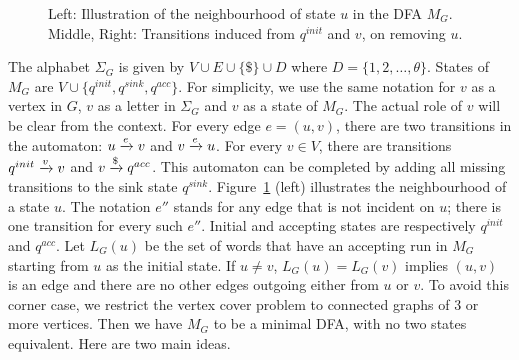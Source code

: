 \begin{figure}
    \caption{Left: Illustration of the neighbourhood of state
      $u$ in the DFA
      $M_G$. Middle, Right: Transitions induced from
      $q^{init}$ and $v$, on removing $u$.}
    \label{fig:complexity-mg}
  \end{figure}

  The alphabet $\Sigma_G$ is given by $V \cup E \cup \{ \$\} \cup
  D$ where $D = \{1,2, \dots, \theta\}$. States of $M_G$ are $V \cup
  \{q^{init}, q^{sink},
  q^{acc}\}$. For simplicity, we use the same notation for
  $v$ as a vertex in $G$, $v$ as a letter in $\Sigma_G$ and
  $v$ as a state of $M_G$. The actual role of
  $v$ will be clear from the context. For every edge $e = (u,
  v)$, there are two transitions in the automaton: $u \xrightarrow{e}
  v$ and $v \xrightarrow{e} u$. For every $v \in
  V$, there are transitions $q^{init} \xrightarrow{v} v$ and $v \xrightarrow{\$}
  q^{acc}$. This automaton can be completed by adding all missing
  transitions to the sink state
  $q^{sink}$. Figure~\ref{fig:complexity-mg} (left) illustrates the
  neighbourhood of a state $u$. The notation
  $e''$ stands for any edge that is not incident on
  $u$; there is one transition for every such
  $e''$. Initial and accepting states are respectively
  $q^{init}$ and $q^{acc}$.
  Let
  $L_G(u)$ be the set of words that have an accepting run in
  $M_G$ starting from
  $u$ as the initial state. 
  If $u \neq v$, $L_G(u) = L_G(v)$ implies
  $(u,v)$ is an edge and there are no other edges outgoing either from
  $u$ or
  $v$. To avoid this corner case, we restrict the vertex cover problem
  to connected graphs of 3 or more vertices. Then we have
  $M_G$ to be a minimal DFA, with no two states equivalent. Here are
  two main ideas.
  

